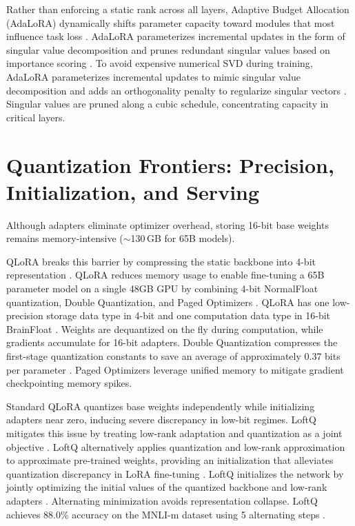 \documentclass[11pt,a4paper]{article}
\begin{document}
Rather than enforcing a static rank across all layers, Adaptive Budget Allocation (AdaLoRA) dynamically shifts parameter capacity toward modules that most influence task loss \cite{zhang2023adalora}. AdaLoRA parameterizes incremental updates in the form of singular value decomposition and prunes redundant singular values based on importance scoring \cite{zhang2023adalora}. To avoid expensive numerical SVD during training, AdaLoRA parameterizes incremental updates to mimic singular value decomposition and adds an orthogonality penalty to regularize singular vectors \cite{zhang2023adalora}. Singular values are pruned along a cubic schedule, concentrating capacity in critical layers.

\section{Quantization Frontiers: Precision, Initialization, and Serving}

Although adapters eliminate optimizer overhead, storing 16-bit base weights remains memory-intensive ($\sim$130\,GB for 65B models).

QLoRA breaks this barrier by compressing the static backbone into 4-bit representation \cite{dettmers2023qlora}. QLoRA reduces memory usage to enable fine-tuning a 65B parameter model on a single 48GB GPU by combining 4-bit NormalFloat quantization, Double Quantization, and Paged Optimizers \cite{dettmers2023qlora}. QLoRA has one low-precision storage data type in 4-bit and one computation data type in 16-bit BrainFloat \cite{dettmers2023qlora}. Weights are dequantized on the fly during computation, while gradients accumulate for 16-bit adapters. Double Quantization compresses the first-stage quantization constants to save an average of approximately 0.37 bits per parameter \cite{dettmers2023qlora}. Paged Optimizers leverage unified memory to mitigate gradient checkpointing memory spikes.

Standard QLoRA quantizes base weights independently while initializing adapters near zero, inducing severe discrepancy in low-bit regimes. LoftQ mitigates this issue by treating low-rank adaptation and quantization as a joint objective \cite{li2023loftq}. LoftQ alternatively applies quantization and low-rank approximation to approximate pre-trained weights, providing an initialization that alleviates quantization discrepancy in LoRA fine-tuning \cite{li2023loftq}. LoftQ initializes the network by jointly optimizing the initial values of the quantized backbone and low-rank adapters \cite{li2023loftq}. Alternating minimization avoids representation collapse. LoftQ achieves 88.0\% accuracy on the MNLI-m dataset using 5 alternating steps \cite{li2023loftq}.
\end{document}
